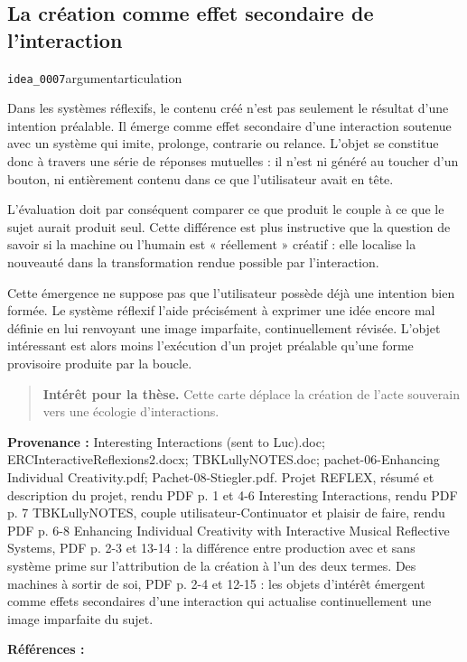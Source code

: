 \documentclass[10pt,a4paper]{article}
\begin{document}
\subsection{La création comme effet secondaire de l'interaction}
{\small\color{metadata} \texttt{idea\_0007}\quad\textbullet\quad argument\quad\textbullet\quad articulation\par}

Dans les systèmes réflexifs, le contenu créé n'est pas seulement le résultat d'une intention préalable. Il émerge comme effet secondaire d'une interaction soutenue avec un système qui imite, prolonge, contrarie ou relance. L'objet se constitue donc à travers une série de réponses mutuelles : il n'est ni généré au toucher d'un bouton, ni entièrement contenu dans ce que l'utilisateur avait en tête.

L'évaluation doit par conséquent comparer ce que produit le couple à ce que le sujet aurait produit seul. Cette différence est plus instructive que la question de savoir si la machine ou l'humain est « réellement » créatif : elle localise la nouveauté dans la transformation rendue possible par l'interaction.

Cette émergence ne suppose pas que l'utilisateur possède déjà une intention bien formée. Le système réflexif l'aide précisément à exprimer une idée encore mal définie en lui renvoyant une image imparfaite, continuellement révisée. L'objet intéressant est alors moins l'exécution d'un projet préalable qu'une forme provisoire produite par la boucle.

\begin{quote}
\textbf{Intérêt pour la thèse.} Cette carte déplace la création de l'acte souverain vers une écologie d'interactions.
\end{quote}
{\footnotesize\color{metadata}\textbf{Provenance :} Interesting Interactions (sent to Luc).doc; ERCInteractiveReflexions2.docx; TBKLullyNOTES.doc; pachet-06-Enhancing Individual Creativity.pdf; Pachet-08-Stiegler.pdf. Projet REFLEX, résumé et description du projet, rendu PDF p. 1 et 4-6 Interesting Interactions, rendu PDF p. 7 TBKLullyNOTES, couple utilisateur-Continuator et plaisir de faire, rendu PDF p. 6-8 Enhancing Individual Creativity with Interactive Musical Reflective Systems, PDF p. 2-3 et 13-14 : la différence entre production avec et sans système prime sur l'attribution de la création à l'un des deux termes. Des machines à sortir de soi, PDF p. 2-4 et 12-15 : les objets d'intérêt émergent comme effets secondaires d'une interaction qui actualise continuellement une image imparfaite du sujet.\par}
{\footnotesize\color{metadata}\textbf{Références :} \parencite{pachet2006reflective,pachet2008machines}\par}
\end{document}
